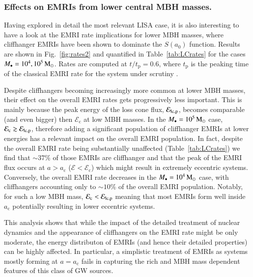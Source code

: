 \documentclass[desactivate]{aa}
\begin{document}
\subsubsection{Effects on EMRIs from lower central MBH masses.}

    Having explored in detail the most relevant LISA  case, it is also interesting to have a look at the EMRI rate implications for lower MBH masses, where cliffhanger EMRIs have been shown to dominate the $S(a_0)$ function. Results are shown in Fig.~\ref{fig:rates2} and quantified in Table~\ref{tab:LCrates} for the cases $M_\bullet = 10^4, 10^5\, {\rm M}_\odot$. Rates are computed at $t/t_\mathrm{p}=0.6$, where $t_\mathrm{p}$ is the peaking time of the classical EMRI rate for the system under scrutiny \citep{2022MNRAS.514.3270B}.
    
    Despite cliffhangers becoming increasingly more common at lower MBH masses, their effect on the overall EMRI rates gets progressively less important. This is mainly because the peak energy of the loss cone flux, $\mathcal{E}_{\rm lc,p}$, becomes comparable (and even bigger) then $\mathcal{E}_\mathrm{c}$ at low MBH masses. In the $M_\bullet = 10^5\, {\rm M}_\odot$ case, $\mathcal{E}_\mathrm{c}\gtrsim \mathcal{E}_{\rm lc,p}$, therefore adding a significant population of cliffhanger EMRIs at lower energies has a relevant impact on the overall EMRI population. In fact, despite the overall EMRI rate being substantially unaffected (Table~\ref{tab:LCrates}) we find that ${\sim}37 \%$ of those EMRIs are cliffhanger and that the peak of the EMRI flux occurs at $a>a_\mathrm{c}$ ($\mathcal{E}<\mathcal{E}_\mathrm{c}$) which might result in extremely eccentric systems. Conversely, the overall EMRI rate decreases in the $M_\bullet = 10^4\, {\rm M}_\odot$ case, with cliffhangers accounting only to ${\sim}10 \%$ of the overall EMRI population. Notably, for such a low MBH mass, $\mathcal{E}_\mathrm{c} < \mathcal{E}_{\rm lc,p}$ meaning that most EMRIs form well inside $a_\mathrm{c}$ potentially resulting in lower eccentric systems.

    This analysis shows that while the impact of the detailed treatment of nuclear dynamics and the appearance of cliffhangers on the EMRI rate might be only moderate, the energy distributon of EMRIs (and hence their detailed properties) can be highly affected. In particular, a simplistic treatment of EMRIs as systems mostly forming at $a=a_\mathrm{c}$ fails in capturing the rich and MBH mass dependent features of this class of GW sources.
        
\end{document}

